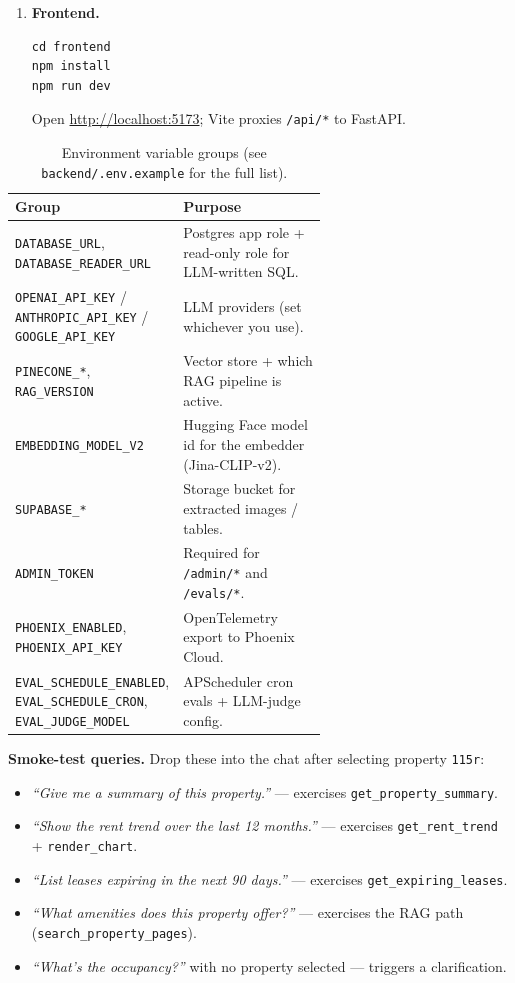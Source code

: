 \documentclass[11pt,a4paper]{article}
\begin{document}
\begin{enumerate}
  \item \textbf{Frontend.}
  \begin{lstlisting}
cd frontend
npm install
npm run dev
  \end{lstlisting}
  Open \href{http://localhost:5173}{http://localhost:5173}; Vite proxies \texttt{/api/*} to FastAPI.
\end{enumerate}

\begin{table}[H]
\centering
\small
\caption{Environment variable groups (see \texttt{backend/.env.example} for the full list).}
\label{tab:env}
\begin{tabular}{@{}lp{0.62\linewidth}@{}}
\toprule
\textbf{Group} & \textbf{Purpose} \\
\midrule
\texttt{DATABASE\_URL}, \texttt{DATABASE\_READER\_URL} & Postgres app role + read-only role for LLM-written SQL. \\
\texttt{OPENAI\_API\_KEY} / \texttt{ANTHROPIC\_API\_KEY} / \texttt{GOOGLE\_API\_KEY} & LLM providers (set whichever you use). \\
\texttt{PINECONE\_*}, \texttt{RAG\_VERSION} & Vector store + which RAG pipeline is active. \\
\texttt{EMBEDDING\_MODEL\_V2} & Hugging Face model id for the embedder (Jina-CLIP-v2). \\
\texttt{SUPABASE\_*} & Storage bucket for extracted images / tables. \\
\texttt{ADMIN\_TOKEN} & Required for \texttt{/admin/*} and \texttt{/evals/*}. \\
\texttt{PHOENIX\_ENABLED}, \texttt{PHOENIX\_API\_KEY} & OpenTelemetry export to Phoenix Cloud. \\
\texttt{EVAL\_SCHEDULE\_ENABLED}, \texttt{EVAL\_SCHEDULE\_CRON}, \texttt{EVAL\_JUDGE\_MODEL} & APScheduler cron evals + LLM-judge config. \\
\bottomrule
\end{tabular}
\end{table}

\textbf{Smoke-test queries.} Drop these into the chat after selecting property \texttt{115r}:
\begin{itemize}
  \item \emph{``Give me a summary of this property.''} --- exercises \texttt{get\_property\_summary}.
  \item \emph{``Show the rent trend over the last 12 months.''} --- exercises \texttt{get\_rent\_trend} + \texttt{render\_chart}.
  \item \emph{``List leases expiring in the next 90 days.''} --- exercises \texttt{get\_expiring\_leases}.
  \item \emph{``What amenities does this property offer?''} --- exercises the RAG path (\texttt{search\_property\_pages}).
  \item \emph{``What's the occupancy?''} with no property selected --- triggers a clarification.
\end{itemize}
\end{document}
